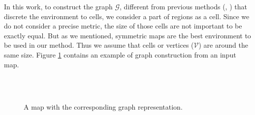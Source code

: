 \documentclass[twocolumn]{svjour3}       %
\begin{document}
%
In this work, to construct the graph $\mathcal{G}$, different from previous methods (\cite{Yun2013}, \cite{Durham2012}) that discrete the environment to cells, we consider a part of regions as a cell. Since we do not consider a precise metric, the size of those cells are not important to be exactly equal. But as we mentioned, symmetric maps are the best environment to be used in our method. Thus we assume that cells or vertices ($\mathcal{V}$)  are around the same size. Figure \ref{fig:samplemap} contains an example of graph construction from an input map. 


\begin{figure}[h]
\centering
	 \\
     \\
    \caption{A map with the corresponding graph representation.}
    \label{fig:samplemap}
\end{figure}
\end{document}

